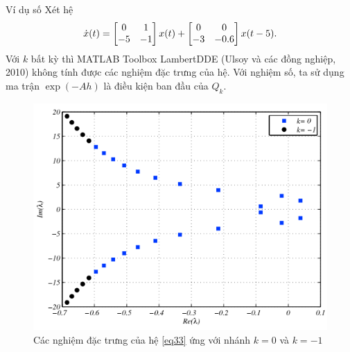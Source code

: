 \documentclass[10pt]{beamer}
\begin{document}
	\small{
	\begin{frame}{Ví dụ số}
		Xét hệ 
		\begin{equation}\label{eq33}
			\dot{x}(t) = \begin{bmatrix} 0 & 1\\ -5 &-1 \end{bmatrix}x(t) + \begin{bmatrix} 	0 & 0\\ -3 &-0.6 \end{bmatrix}x(t - 5).
		\end{equation}
		Với $k$ bất kỳ thì MATLAB Toolbox LambertDDE (Ulsoy và các đồng nghiệp, 2010) không tính được các nghiệm đặc trưng của hệ. 
		Với nghiệm số, ta sử dụng ma trận $\exp (-Ah )$ là điều kiện ban đầu của $Q_k$. 
		
		\begin{figure}[h!]
			\centering
			\includegraphics[scale= 0.4]{"../Hinh/Hinh 2"}
			\caption{ Các nghiệm đặc trưng của hệ \eqref{eq33} ứng với nhánh $k=0$  và $k = -1$  }
			\label{fig:hinh-2}
		\end{figure}
	\end{frame}
}
\end{document}

